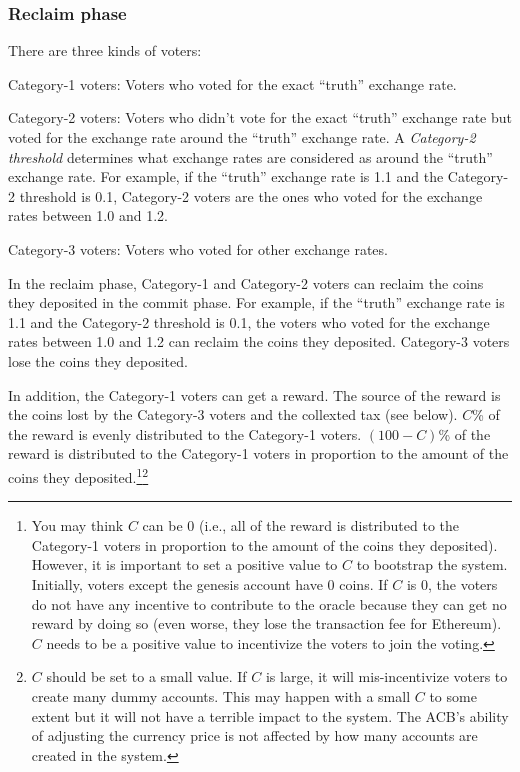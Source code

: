 \documentclass[dvipdfmx,a4paper]{article}
\begin{document}
\subsubsection{Reclaim phase}

There are three kinds of voters:

\begin{description}
\item{Category-1 voters}: Voters who voted for the exact ``truth'' exchange rate.
\item{Category-2 voters}: Voters who didn't vote for the exact ``truth'' exchange rate but voted for the exchange rate around the ``truth'' exchange rate. A \textit{Category-2 threshold} determines what exchange rates are considered as around the ``truth'' exchange rate. For example, if the ``truth'' exchange rate is 1.1 and the Category-2 threshold is 0.1, Category-2 voters are the ones who voted for the exchange rates between 1.0 and 1.2.
\item{Category-3 voters}: Voters who voted for other exchange rates.
\end{description}

In the reclaim phase, Category-1 and Category-2 voters can reclaim the coins they deposited in the commit phase. For example, if the ``truth'' exchange rate is 1.1 and the Category-2 threshold is 0.1, the voters who voted for the exchange rates between 1.0 and 1.2 can reclaim the coins they deposited. Category-3 voters lose the coins they deposited.

In addition, the Category-1 voters can get a reward. The source of the reward is the coins lost by the Category-3 voters and the collexted tax (see below). $C$\% of the reward is evenly distributed to the Category-1 voters. $(100-C)$\% of the reward is distributed to the Category-1 voters in proportion to the amount of the coins they deposited.\footnote{You may think $C$ can be 0 (i.e., all of the reward is distributed to the Category-1 voters in proportion to the amount of the coins they deposited). However, it is important to set a positive value to $C$ to bootstrap the system. Initially, voters except the genesis account have 0 coins. If $C$ is 0, the voters do not have any incentive to contribute to the oracle because they can get no reward by doing so (even worse, they lose the transaction fee for Ethereum). $C$ needs to be a positive value to incentivize the voters to join the voting.}\footnote{$C$ should be set to a small value. If $C$ is large, it will mis-incentivize voters to create many dummy accounts. This may happen with a small $C$ to some extent but it will not have a terrible impact to the system. The ACB's ability of adjusting the currency price is not affected by how many accounts are created in the system.}
\end{document}
